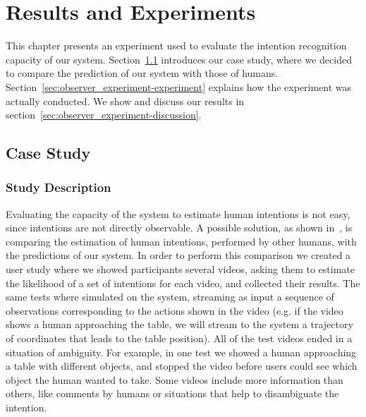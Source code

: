 \chapter{Results and Experiments} %

\label{chapter:observer_results} %


This chapter presents an experiment used to evaluate the intention recognition capacity of our system. Section~\ref{sec:observer_experiment-case_study} introduces our case study, where we decided to compare the prediction of our system with those of humans. Section~\ref{sec:observer_experiment-experiment} explains how the experiment was actually conducted. We show and discuss our results in section~\ref{sec:observer_experiment-discussion}.


\section{Case Study}
\label{sec:observer_experiment-case_study}
\subsection{Study Description}

Evaluating the capacity of the system to estimate human intentions is not easy, since intentions are not directly observable. A possible solution, as shown in~\cite{baker2014modeling}, is comparing the estimation of human intentions, performed by other humans, with the predictions of our system. In order to perform this comparison we created a user study where we showed participants several videos, asking them to estimate the likelihood of a set of intentions  for each video, and collected their results. The same tests where simulated on the system, streaming as input a sequence of observations  corresponding to the actions shown in the video (e.g. if the video shows a human approaching the table, we will stream to the system a trajectory of coordinates that leads to the table position). All of the test videos ended in a situation of ambiguity. For example, in one test we showed a human approaching a table with different objects, and stopped the video before users could see which object the human wanted to take. Some videos include more information than others, like comments by humans or situations that help to disambiguate the intention. 

